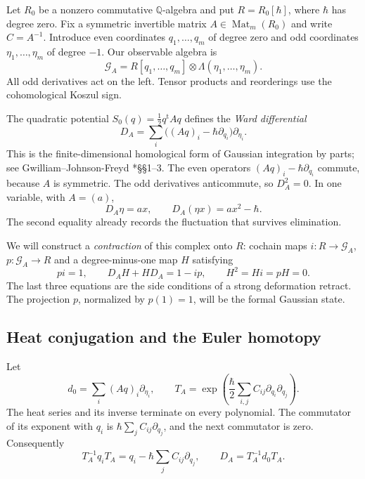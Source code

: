 Let $R_0$ be a nonzero commutative $\mathbb Q$-algebra and put
$R=R_0[\hbar]$, where $\hbar$ has degree zero. Fix a symmetric
invertible matrix $A\in\operatorname{Mat}_m(R_0)$ and write
$C=A^{-1}$. Introduce even coordinates $q_1,\ldots,q_m$ of
degree zero and odd coordinates $\eta_1,\ldots,\eta_m$ of
degree $-1$. Our observable algebra is
\[
 \mathcal G_A=R[q_1,\ldots,q_m]\otimes
                         \Lambda(\eta_1,\ldots,\eta_m).
\]
All odd derivatives act on the left. Tensor products and
reorderings use the cohomological Koszul sign.

The quadratic potential $S_0(q)=\tfrac12q^{\mathrm t}Aq$
defines the \emph{Ward differential}
\begin{equation}\label{eq:vol2-gaussian-ward}
 D_A=\sum_i\bigl((Aq)_i-\hbar\partial_{q_i}\bigr)
                                             \partial_{\eta_i}.
\end{equation}
This is the finite-dimensional homological form of Gaussian
integration by parts; see Gwilliam--Johnson-Freyd
\cite{GwilliamJohnsonFreyd2019}*{\S\S1--3}.
The even operators $(Aq)_i-\hbar\partial_{q_i}$ commute, because
$A$ is symmetric. The odd derivatives anticommute, so $D_A^2=0$.
In one variable, with $A=(a)$,
\begin{equation}\label{eq:vol2-ward-square}
 D_A\eta=ax,\qquad
 D_A(\eta x)=ax^2-\hbar.
\end{equation}
The second equality already records the fluctuation that survives
elimination.

We will construct a \emph{contraction} of this complex onto $R$:
cochain maps $i:R\to\mathcal G_A$, $p:\mathcal G_A\to R$ and
a degree-minus-one map $H$ satisfying
\[
 pi=1,\qquad D_AH+HD_A=1-ip,
 \qquad H^2=Hi=pH=0.
\]
The last three equations are the side conditions of a strong
deformation retract. The projection $p$, normalized by $p(1)=1$,
will be the formal Gaussian state.

\subsection{Heat conjugation and the Euler homotopy}

Let
\[
 d_0=\sum_i(Aq)_i\partial_{\eta_i},\qquad
 T_A=\exp\!\left(\frac{\hbar}{2}
                 \sum_{i,j}C_{ij}\partial_{q_i}\partial_{q_j}\right).
\]
The heat series and its inverse terminate on every polynomial.
The commutator of its exponent with $q_i$ is
$\hbar\sum_jC_{ij}\partial_{q_j}$, and the next commutator is zero.
Consequently
\begin{equation}\label{eq:vol2-ward-conjugation}
 T_A^{-1}q_iT_A=q_i-\hbar\sum_jC_{ij}\partial_{q_j},
 \qquad D_A=T_A^{-1}d_0T_A.
\end{equation}

